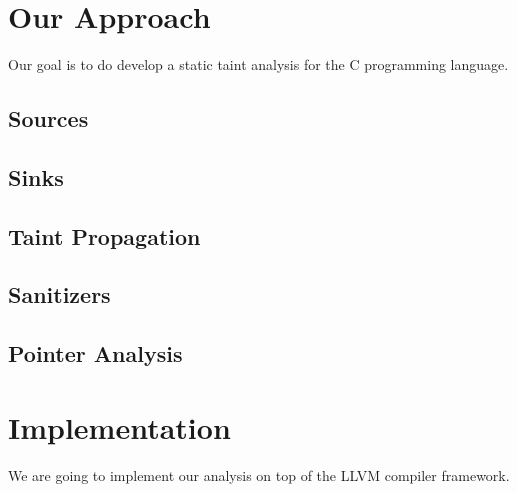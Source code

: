 \section{Our Approach}

Our goal is to do develop a static taint analysis for
the C programming language.

\subsection{Sources}\label{analysis:sources}

\subsection{Sinks}\label{analysis:sinks}

\subsection{Taint Propagation}\label{analysis:propagation}

\subsection{Sanitizers}\label{analysis:sanitizers}

\subsection{Pointer Analysis}\label{analysis:pointers}

\section{Implementation}

We are going to implement our analysis on top of the LLVM
compiler framework.